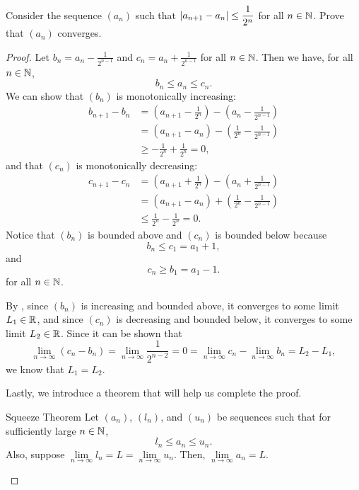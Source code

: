 \begin{problem}
  Consider the sequence $(a_{n})$ such that $\left\lvert a_{n+1} - a_{n} \right\rvert \leq \dfrac{1}{2^{n}}$ 
  for all $n \in \mathbb{N}$. Prove that $(a_{n})$ converges.

  \begin{proof}
    Let $b_{n} = a_{n} - \frac{1}{2^{n-1}}$ and $c_{n} = a_{n} + \frac{1}{2^{n-1}}$
    for all $n \in \mathbb{N}$. Then we have, for all $n \in \mathbb{N}$,
    \[
      b_{n} \leq a_{n} \leq c_{n}.
    \]
    We can show that $(b_{n})$ is monotonically increasing:
    \begin{align*}
      b_{n+1} - b_{n} &= \left( a_{n+1} - \frac{1}{2^{n}} \right) - \left( a_{n} - \frac{1}{2^{n-1}} \right) \\
      &= (a_{n+1} - a_{n}) - \left( \frac{1}{2^{n}} - \frac{1}{2^{n-1}} \right) \\
      &\geq -\frac{1}{2^{n}} + \frac{1}{2^{n}} = 0,
    \end{align*}
    and that $(c_{n})$ is monotonically decreasing:
    \begin{align*}
      c_{n+1} - c_{n} &= \left( a_{n+1} + \frac{1}{2^{n}} \right) - \left( a_{n} + \frac{1}{2^{n-1}} \right) \\
      &= (a_{n+1} - a_{n}) + \left( \frac{1}{2^{n}} - \frac{1}{2^{n-1}} \right) \\
      &\leq \frac{1}{2^{n}} - \frac{1}{2^{n}} = 0.
    \end{align*}
    Notice that $(b_{n})$ is bounded above and $(c_{n})$ is bounded below because
    \[
      b_{n} \leq c_{1} = a_{1} + 1,
    \]
    and 
    \[
      c_{n} \geq b_{1} = a_{1} - 1.
    \]
    for all $n \in \mathbb{N}$.

    By , since $(b_{n})$ is increasing and
    bounded above, it converges to some limit $L_{1} \in \mathbb{R}$, and since $(c_{n})$ is
    decreasing and bounded below, it converges to some limit $L_{2} \in \mathbb{R}$. Since it can be shown that
    \[
      \lim_{n \to \infty} (c_{n} - b_{n}) = \lim_{n \to \infty} \frac{1}{2^{n-2}} = 0 = \lim_{n \to \infty} c_{n} - \lim_{n \to \infty} b_{n} = L_{2} - L_{1}, 
    \]
    we know that $L_{1} = L_{2}$. 

    Lastly, we introduce a theorem that will help us complete the proof.

    \begin{theorem}{Squeeze Theorem}
      \label{thm:squeeze-theorem}
      Let $(a_{n})$, $(l_{n})$, and $(u_{n})$ be sequences such that for sufficiently large $n \in \mathbb{N}$,
      \[
        l_{n} \leq a_{n} \leq u_{n}.
      \]
      Also, suppose $\lim\limits_{n \to \infty} l_{n} = L = \lim\limits_{n \to \infty} u_{n}$. 
      Then, $\lim\limits_{n \to \infty} a_{n} = L$.
    \end{theorem}


\end{proof}
\end{problem}
